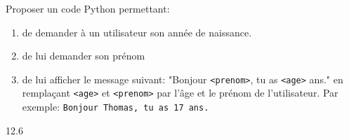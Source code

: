 \documentclass[a4paper,10pt]{report}
\def\ptsexoG{2}
\begin{document}
\exods{\ptsexoG}

Proposer un code Python permettant:

\begin{enumerate}
    \item de demander à un utilisateur son année de naissance.
    \item de lui demander son prénom
    \item de lui afficher le message suivant: "Bonjour \texttt{<prenom>}, tu as \texttt{<age>} ans." en remplaçant \verb|<age>| et \verb|<prenom>| par l'âge et le prénom de l'utilisateur. Par exemple:  \quad \verb|Bonjour Thomas, tu as 17 ans.|
    \end{enumerate}
    
    \begin{answer}{1}{2.6}    \end{answer}
\end{document}
